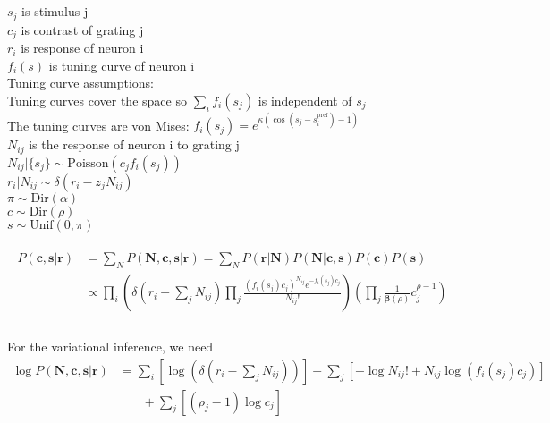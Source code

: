 \documentclass[12pt]{article}
\begin{document}
\\
 \\
$s_j$ is stimulus j\\
$c_j$ is contrast of grating j\\
$r_i$ is response of neuron i\\
$f_i(s)$ is tuning curve of neuron i\\
Tuning curve assumptions:\\
Tuning curves cover the space so $\sum_i f_i(s_j)$ is independent of $s_j$\\
The tuning curves are von Mises: $f_i(s_j) = e^{\kappa(\cos(s_j - s_i^{\text{pref}}) - 1)}$\\
$N_{ij}$ is the response of neuron i to grating j\\
$N_{ij}|\{s_j\}  \sim \text{Poisson}(c_j f_i(s_j))$\\
$r_i|N_{ij} \sim \delta(r_i - z_j N_{ij})$\\
$\pi \sim \text{Dir} (\alpha)$\\
$c \sim \text{Dir} (\rho)$\\
$s \sim \text{Unif} (0, \pi)$\\
\\
\begin{equation}
\begin{aligned}
P(\mathbf{c, s|r}) & = \sum_N P(\mathbf{N, c, s|r}) = \sum_N P(\mathbf{r|N}) P(\mathbf{N|c, s}) P(\mathbf{c}) P(\mathbf{s})\\
&\propto \prod_i (\delta(r_i - \sum_j N_{ij}) \prod_j\frac{(f_i(s_j)c_j)^{N_{ij}} e^{-f_i(s_j) c_j}}{N_{ij}!}) (\prod_j \frac{1}{\mathbf{\beta}(\rho)} c_j^{\rho - 1})\\
\end{aligned}
\end{equation}
\\
For the variational inference, we need\\
 \begin{equation}
\begin{aligned}
\log P(\mathbf{N, c, s| r}) &= \sum_i [\log(\delta(r_i - \sum_j N_{ij}))] - \sum_j [-\log N_{ij}! + N_{ij} \log(f_i(s_j)c_j)]\\
& \phantom{{}=1} + \sum_j [(\rho_j - 1)\log c_j]\\
\end{aligned}
\end{equation}
\end{document}

